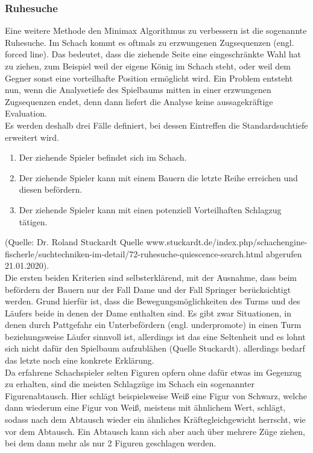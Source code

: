 \subsubsection{Ruhesuche}
Eine weitere Methode den Minimax Algorithmus zu verbessern ist die sogenannte Ruhesuche. Im Schach kommt es oftmals zu erzwungenen Zugsequenzen (engl. forced line). Das bedeutet, dass die ziehende Seite eine eingeschränkte Wahl hat zu ziehen, zum Beispiel weil der eigene König im Schach steht, oder weil dem Gegner sonst eine vorteilhafte Position ermöglicht wird. Ein Problem entsteht nun, wenn die Analysetiefe des Spielbaums mitten in einer erzwungenen Zugsequenzen endet, denn dann liefert die Analyse keine aussagekräftige Evaluation.\\
Es werden deshalb drei Fälle definiert, bei dessen Eintreffen die Standardsuchtiefe erweitert wird.
\begin{enumerate}
    \item Der ziehende Spieler befindet sich im Schach.
    \item Der ziehende Spieler kann mit einem Bauern die letzte Reihe erreichen und diesen befördern.
    \item Der ziehende Spieler kann mit einen potenziell Vorteilhaften Schlagzug tätigen.
\end{enumerate}
(Quelle: Dr. Roland Stuckardt Quelle www.stuckardt.de/index.php/schachengine-fischerle/suchtechniken-im-detail/72-ruhesuche-quiescence-search.html abgerufen 21.01.2020).\\
Die ersten beiden Kriterien sind selbsterklärend, mit der Ausnahme, dass beim befördern der Bauern nur der Fall Dame und der Fall Springer berücksichtigt werden. Grund hierfür ist, dass die Bewegungsmöglichkeiten des Turms und des Läufers beide in denen der Dame enthalten sind. Es gibt zwar Situationen, in denen durch Pattgefahr ein Unterbefördern (engl. underpromote) in einen Turm beziehungsweise Läufer sinnvoll ist, allerdings ist das eine Seltenheit und es lohnt sich nicht dafür den Spielbaum aufzublähen (Quelle Stuckardt).
allerdings bedarf das letzte noch eine konkrete Erklärung.\\
Da erfahrene Schachspieler selten Figuren opfern ohne dafür etwas im Gegenzug zu erhalten, sind die meisten Schlagzüge im Schach ein sogenannter Figurenabtausch. Hier schlägt beispielsweise Weiß eine Figur von Schwarz, welche dann wiederum eine Figur von Weiß, meistens mit ähnlichem Wert, schlägt, sodass nach dem Abtausch wieder ein ähnliches Kräftegleichgewicht herrscht, wie vor dem Abtausch. Ein Abtausch kann sich aber auch über mehrere Züge ziehen, bei dem dann mehr als nur 2 Figuren geschlagen werden.
